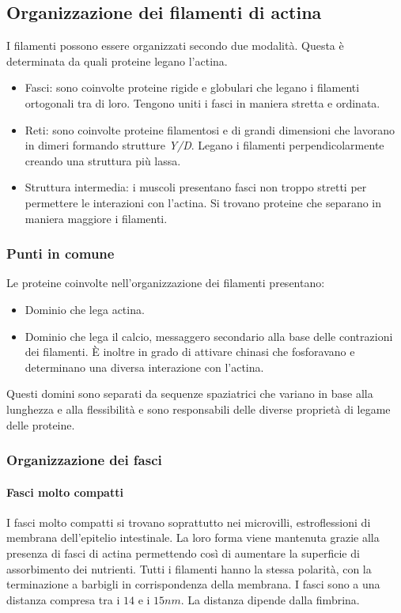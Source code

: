 	\subsection{Organizzazione dei filamenti di actina}
	I filamenti possono essere organizzati secondo due modalit\`a.
	Questa \`e determinata da quali proteine legano l'actina.
	\begin{multicols}{2}
		\begin{itemize}
			\item Fasci: sono coinvolte proteine rigide e globulari che legano i filamenti ortogonali tra di loro.
				Tengono uniti i fasci in maniera stretta e ordinata.
			\item Reti: sono coinvolte proteine filamentosi e di grandi dimensioni che lavorano in dimeri formando strutture \emph{Y/D}.
				Legano i filamenti perpendicolarmente creando una struttura pi\`u lassa.
			\item Struttura intermedia: i muscoli presentano fasci non troppo stretti per permettere le interazioni con l'actina.
				Si trovano proteine che separano in maniera maggiore i filamenti.
		\end{itemize}
	\end{multicols}

		\subsubsection{Punti in comune}
		Le proteine coinvolte nell'organizzazione dei filamenti presentano:
		\begin{multicols}{2}
			\begin{itemize}
				\item Dominio che lega actina.
				\item Dominio che lega il calcio, messaggero secondario alla base delle contrazioni dei filamenti.
					\`E inoltre in grado di attivare chinasi che fosforavano e determinano una diversa interazione con l'actina.
			\end{itemize}
		\end{multicols}
		Questi domini sono separati da sequenze spaziatrici che variano in base alla lunghezza e alla flessibilit\`a e sono responsabili delle diverse propriet\`a di legame delle proteine.

		\subsubsection{Organizzazione dei fasci}
		
			\paragraph{Fasci molto compatti}
			I fasci molto compatti si trovano soprattutto nei microvilli, estroflessioni di membrana dell'epitelio intestinale.
			La loro forma viene mantenuta grazie alla presenza di fasci di actina permettendo cos\`i di aumentare la superficie di assorbimento dei nutrienti.
			Tutti i filamenti hanno la stessa polarit\`a, con la terminazione a barbigli in corrispondenza della membrana.
			I fasci sono a una distanza compresa tra i $14$ e i $15nm$.
			La distanza dipende dalla fimbrina.

